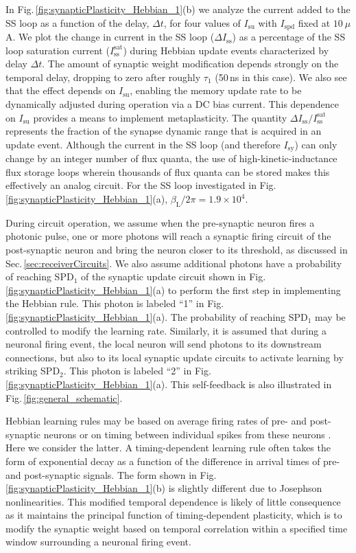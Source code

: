 \documentclass[twocolumn]{article}
\begin{document}
In Fig.\,\ref{fig:synapticPlasticity_Hebbian_1}(b) we analyze the current added to the SS loop as a function of the delay, $\Delta t$, for four values of $I_{\mathrm{su}}$ with $I_{\mathrm{spd}}$ fixed at $10~\mu$A. We plot the change in current in the SS loop ($\Delta I_{\mathrm{ss}}$) as a percentage of the SS loop saturation current ($I_{\mathrm{ss}}^{\mathrm{sat}}$) during Hebbian update events characterized by delay $\Delta t$. The amount of synaptic weight modification depends strongly on the temporal delay, dropping to zero after roughly $\tau_1$ (50\,ns in this case). We also see that the effect depends on $I_{\mathrm{su}}$, enabling the memory update rate to be dynamically adjusted during operation via a DC bias current. This dependence on $I_{\mathrm{su}}$ provides a means to implement metaplasticity. The quantity $\Delta I_{\mathrm{ss}}/I_{\mathrm{ss}}^{\mathrm{sat}}$ represents the fraction of the synapse dynamic range that is acquired in an update event. Although the current in the SS loop (and therefore $I_{\mathrm{sy}}$) can only change by an integer number of flux quanta, the use of high-kinetic-inductance flux storage loops wherein thousands of flux quanta can be stored makes this effectively an analog circuit. For the SS loop investigated in Fig.\,\ref{fig:synapticPlasticity_Hebbian_1}(a), $\beta_{\mathrm{L}}/2\pi = 1.9\times 10^4$. 

During circuit operation, we assume when the pre-synaptic neuron fires a photonic pulse, one or more photons will reach a synaptic firing circuit of the post-synaptic neuron and bring the neuron closer to its threshold, as discussed in Sec.\,\ref{sec:receiverCircuits}. We also assume additional photons have a probability of reaching SPD$_1$ of the synaptic update circuit shown in Fig.\,\ref{fig:synapticPlasticity_Hebbian_1}(a) to perform the first step in implementing the Hebbian rule. This photon is labeled ``1'' in Fig.\,\ref{fig:synapticPlasticity_Hebbian_1}(a). The probability of reaching SPD$_1$ may be controlled to modify the learning rate. Similarly, it is assumed that during a neuronal firing event, the local neuron will send photons to its downstream connections, but also to its local synaptic update circuits to activate learning by striking SPD$_2$. This photon is labeled ``2'' in Fig.\,\ref{fig:synapticPlasticity_Hebbian_1}(a). This self-feedback is also illustrated in Fig.\,\ref{fig:general_schematic}.

Hebbian learning rules may be based on average firing rates of pre- and post-synaptic neurons or on timing between individual spikes from these neurons \cite{geki2002}. Here we consider the latter. A timing-dependent learning rule often takes the form of exponential decay as a function of the difference in arrival times of pre- and post-synaptic signals. The form shown in Fig.\,\ref{fig:synapticPlasticity_Hebbian_1}(b) is slightly different due to Josephson nonlinearities. This modified temporal dependence is likely of little consequence as it maintains the principal function of timing-dependent plasticity, which is to modify the synaptic weight based on temporal correlation within a specified time window surrounding a neuronal firing event. 
\end{document}
